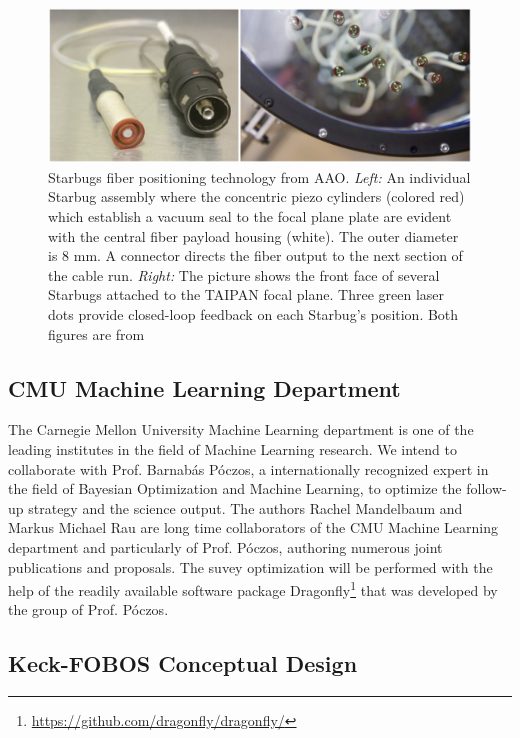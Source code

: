 \documentclass[oneside,11pt]{amsart}
\begin{document}
\begin{figure}[h!]
 \vskip -0.1in
 \includegraphics[width=\textwidth]{figs/starbugs.png}
 \caption{\small Starbugs fiber positioning technology from AAO.  {\it Left:} An individual Starbug assembly where the concentric piezo cylinders (colored red) which establish a vacuum seal to the focal plane plate are evident with the central fiber payload housing (white).  The outer diameter is 8 mm.  A connector directs the fiber output to the next section of the cable run. {\it Right:} The picture shows the front face of several Starbugs attached to the TAIPAN focal plane.  Three green laser dots provide closed-loop feedback on each Starbug's position.  Both figures are from \citet{staszak16.} }\label{fig:starbugs}
\end{figure}

\subsection{CMU Machine Learning Department}
The Carnegie Mellon University Machine Learning department is one of the leading institutes in the field of Machine Learning research. We intend to collaborate with Prof. Barnab{\'a}s P{\'o}czos, a internationally recognized expert in the field of Bayesian Optimization and Machine Learning, to optimize the follow-up strategy and the science output. The authors Rachel Mandelbaum and Markus Michael Rau are long time collaborators of the CMU Machine Learning department and particularly of Prof. P{\'o}czos, authoring numerous joint publications and proposals. The suvey optimization will be performed with the help of the readily available software package Dragonfly\footnote{\url{https://github.com/dragonfly/dragonfly/}} that was developed by the group of Prof. P{\'o}czos.



\subsection{Keck-FOBOS Conceptual Design}
\end{document}
